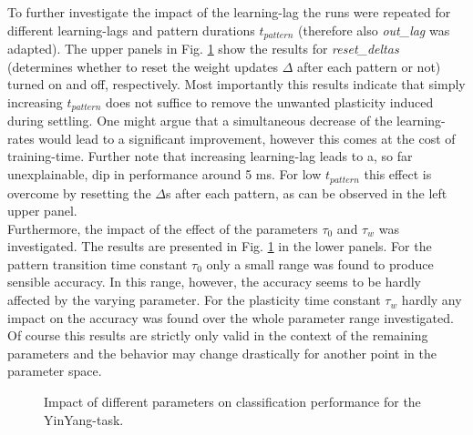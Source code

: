 \documentclass[12pt,a4paper]{article}
\begin{document}
To further investigate the impact of the learning-lag the runs were repeated for different learning-lags and pattern durations $t_{pattern}$ (therefore also \textit{out\_lag} was adapted). 
The upper panels in Fig. \ref{fig:yinyang_vary} show the results for \textit{reset\_deltas} (determines whether to reset the weight updates $\Delta$ after each pattern or not) turned on and off, respectively. Most importantly this results indicate that simply increasing $t_{pattern}$ does not suffice to remove the unwanted plasticity induced during settling. One might argue that a simultaneous decrease of the learning-rates would lead to a significant improvement, however this comes at the cost of training-time. Further note that increasing learning-lag leads to a, so far unexplainable, dip in performance around 5 ms. For low $t_{pattern}$ this effect is overcome by resetting the $\Delta$s after each pattern, as can be observed in the left upper panel.\\
Furthermore, the impact of the effect of the parameters $\tau_0$ and $\tau_w$ was investigated. The results are presented in Fig. \ref{fig:yinyang_vary} in the lower panels. For the pattern transition time constant $\tau_0$ only a small range was found to produce sensible accuracy. In this range, however, the accuracy seems to be hardly affected by the varying parameter. For the plasticity time constant $\tau_w$ hardly any impact on the accuracy was found over the whole parameter range investigated. Of course this results are strictly only valid in the context of the remaining parameters and the behavior may change drastically for another point in the parameter space. 


\begin{figure}[!ht]
  \centering
  \quad
  \quad
  \quad
  \caption{Impact of different parameters on classification performance for the YinYang-task.}
  \label{fig:yinyang_vary}
\end{figure}
\end{document}
